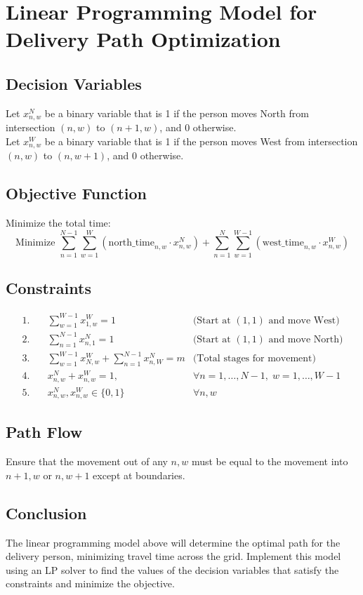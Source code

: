 \documentclass{article}
\begin{document}
\section*{Linear Programming Model for Delivery Path Optimization}

\subsection*{Decision Variables}
Let \( x_{n,w}^N \) be a binary variable that is 1 if the person moves North from intersection \((n, w)\) to \((n+1, w)\), and 0 otherwise. \\
Let \( x_{n,w}^W \) be a binary variable that is 1 if the person moves West from intersection \((n, w)\) to \((n, w+1)\), and 0 otherwise.

\subsection*{Objective Function}
Minimize the total time:
\[
\text{Minimize } \sum_{n=1}^{N-1} \sum_{w=1}^{W} \left( \text{north\_time}_{n,w} \cdot x_{n,w}^N \right) + \sum_{n=1}^{N} \sum_{w=1}^{W-1} \left( \text{west\_time}_{n,w} \cdot x_{n,w}^W \right)
\]

\subsection*{Constraints}
\begin{align*}
1. & \quad \sum_{w=1}^{W-1} x_{1,w}^W = 1 & \text{(Start at } (1,1) \text{ and move West)} \\
2. & \quad \sum_{n=1}^{N-1} x_{n,1}^N = 1 & \text{(Start at } (1,1) \text{ and move North)} \\
3. & \quad \sum_{w=1}^{W-1} x_{N,w}^W + \sum_{n=1}^{N-1} x_{n,W}^N = m & \text{(Total stages for movement)} \\
4. & \quad x_{n,w}^N + x_{n,w}^W = 1, & \forall n=1, \ldots, N-1, \; w=1, \ldots, W-1 \\
5. & \quad x_{n,w}^N, x_{n,w}^W \in \{0, 1\} & \forall n, w
\end{align*}

\subsection*{Path Flow}
Ensure that the movement out of any \(n, w\) must be equal to the movement into \( n+1, w \) or \( n, w+1 \) except at boundaries.

\subsection*{Conclusion}
The linear programming model above will determine the optimal path for the delivery person, minimizing travel time across the grid. Implement this model using an LP solver to find the values of the decision variables that satisfy the constraints and minimize the objective.
\end{document}
